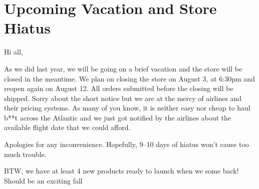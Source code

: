 \chapter{Upcoming Vacation and Store Hiatus}

\begin{refsection}

Hi all,

As we did last year, we will be going on a brief vacation and the store will be closed in the meantime. We plan on closing the store on August 3, at 6:30pm and reopen again on August 12. All orders submitted before the closing will be shipped. Sorry about the short notice but we are at the mercy of airlines and their pricing systems. As many of you know, it is neither easy nor cheap to haul b**t across the Atlantic and we just got notified by the airlines about the available flight date that we could afford.

Apologies for any inconvenience. Hopefully, 9--10 days of hiatus won't cause too much trouble.

BTW, we have at least 4 new products ready to launch when we some back! Should be an exciting fall

\printbibliography[heading=subbibliography]

\end{refsection}